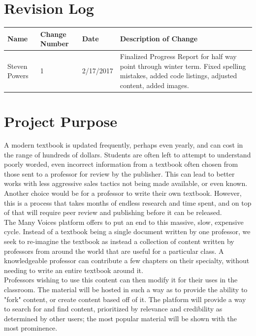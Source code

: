 \documentclass[onecolumn, draftclsnofoot,10pt, compsoc]{IEEEtran}
\begin{document}
\section{Revision Log}

\tablehead{}
\begin{supertabular}{|p{3cm}|p{3cm}|p{3cm}|p{7cm}|}
\hline
Name & Change Number & Date & Description of Change
\\\hline
Steven Powers & 1 & 2/17/2017 & Finalized Progress Report for half way point through 
		winter term. Fixed spelling mistakes, added code listings, adjusted content, added images.
\\\hline
\end{supertabular}


\section{Project Purpose}
\noindent A modern textbook is updated frequently, perhaps even yearly,
and can cost in the range of hundreds of dollars. Students are often left
to attempt to understand poorly worded, even incorrect information from a textbook
often chosen from those sent to a professor for review by the publisher.
This can lead to better works with less aggressive sales tactics not being
made available, or even known.
Another choice would be for a professor to write their own textbook.
However, this is a process that takes months of endless research and
time spent, and on top of that will require peer review and publishing
before it can be released. \\

\noindent The Many Voices platform offers to put an end to this massive,
slow, expensive cycle.  Instead of a textbook being a single document
written by one professor, we seek to re-imagine the textbook as instead
a collection of content written by professors from around the world
that are useful for a particular class. A knowledgeable professor can
contribute a few chapters on their specialty, without needing to write
an entire textbook around it. \\

\noindent Professors wishing to use this content can then modify it for
their uses in the classroom. The material will be hosted in such a way
as to provide the ability to "fork" content, or create content based
off of it. The platform will provide a way to search for and find content,
prioritized by relevance and credibility as determined by other users;
the most popular material will be shown with the most prominence.
\end{document}
